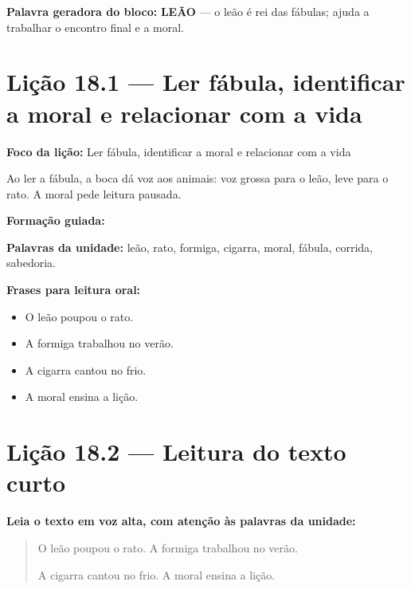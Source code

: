 \textbf{Palavra geradora do bloco:} \textbf{LEÃO} --- o leão é rei das fábulas; ajuda a trabalhar o encontro final e a moral.

\section{Lição 18.1 --- Ler fábula, identificar a moral e relacionar com a vida}

\textbf{Foco da lição:} Ler fábula, identificar a moral e relacionar com a vida


\begin{boquinha}
Ao ler a fábula, a boca dá voz aos animais: voz grossa para o leão, leve para o rato. A moral pede leitura pausada.
\end{boquinha}

\noindent\textbf{Formação guiada:}

\begin{center}
\end{center}

\noindent\textbf{Palavras da unidade:} leão, rato, formiga, cigarra, moral, fábula, corrida, sabedoria.

\noindent\textbf{Frases para leitura oral:}
\begin{itemize}[leftmargin=1.6em]
  \item O leão poupou o rato.
  \item A formiga trabalhou no verão.
  \item A cigarra cantou no frio.
  \item A moral ensina a lição.
\end{itemize}

\section{Lição 18.2 --- Leitura do texto curto}

\noindent\textbf{Leia o texto em voz alta, com atenção às palavras da unidade:}


\begin{quote}
O leão poupou o rato. A formiga trabalhou no verão.

A cigarra cantou no frio. A moral ensina a lição.
\end{quote}

